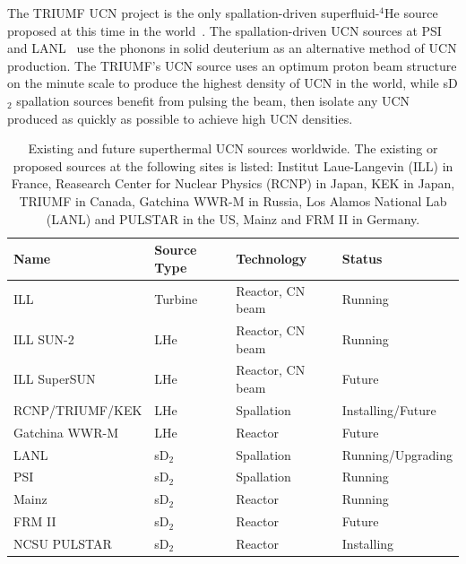 The TRIUMF UCN project is the only spallation-driven superfluid-$^4$He
source proposed at this time in the world~\cite{Ruediger}. The
spallation-driven UCN sources at PSI~\cite{Ries_ascona} and
LANL~\cite{Ito_ascona} use the phonons in solid deuterium as an
alternative method of UCN production.
The TRIUMF's UCN source uses an optimum proton beam structure on the
minute scale to produce the highest density of UCN in the world, while
sD$_2$ spallation sources benefit from pulsing the beam, then isolate
any UCN produced as quickly as possible to achieve high UCN densities.


\begin{table}
\begin{center}
\begin{tabular}{|l|l|l|l|}
\hline
Name & Source Type & Technology & Status \\
\hline
ILL  & Turbine & Reactor, CN beam & Running
\\
\hline
ILL SUN-2 & LHe & Reactor, CN beam & Running 
\\
\hline
ILL SuperSUN & LHe & Reactor, CN beam & Future
\\
\hline
RCNP/TRIUMF/KEK & LHe & Spallation & Installing/Future
\\
\hline
Gatchina WWR-M & LHe & Reactor & Future
\\
\hline
LANL & sD$_2$ & Spallation & Running/Upgrading
\\
\hline
PSI & sD$_2$ & Spallation & Running
\\
\hline
Mainz & sD$_2$ & Reactor & Running
\\
\hline
FRM II & sD$_2$ & Reactor & Future
\\
\hline
NCSU PULSTAR & sD$_2$ & Reactor & Installing
\\
\hline 
\end{tabular}
\end{center}
\caption{Existing and future superthermal UCN sources worldwide. The
  existing or proposed sources at the following sites is listed:
  Institut Laue-Langevin (ILL) in France, Reasearch Center for Nuclear
  Physics (RCNP) in Japan, KEK in Japan, TRIUMF in Canada, Gatchina
  WWR-M in Russia, Los Alamos National Lab (LANL) and PULSTAR in the
  US, Mainz and FRM II in Germany. }
\label{tab:full_ucn_sources}
\end{table}
